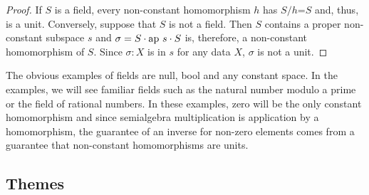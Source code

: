 \documentclass[11pt]{article}
\begin{document}
\begin{proof} If $S$ is a field, every non-constant homomorphism $h$ has $S/h$=$S$ and, thus, is a unit.  Conversely, 
suppose that $S$ is not a field.  Then $S$ contains a proper non-constant subspace $s$ and $\sigma = S\cdot {\rm ap}\ s\cdot S$ is,
therefore, a non-constant homomorphism of $S$.  Since $\sigma:X$ is in $s$ for any data $X$, $\sigma$ is not a unit. 
\end{proof}

\noindent 
The obvious examples of fields are null, bool and any constant space.  In the examples, we will see familiar fields such 
as the natural number modulo a prime or the field of rational numbers.  In these examples, zero will be the only constant 
homomorphism and since semialgebra multiplication is application by a homomorphism, the guarantee of an inverse 
for non-zero elements comes from a guarantee that non-constant homomorphisms are units.   

\subsection{Themes}
\end{document}

